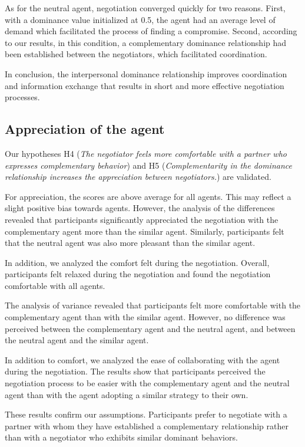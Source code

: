 \documentclass[10pt, a4paper, twocolumn]{article} %
\begin{document}
As for the neutral agent, negotiation converged quickly for two reasons. First, with a dominance value initialized at 0.5, the agent had an average level of demand which facilitated the process of finding a compromise. 
Second, according to our results, in this condition, a complementary dominance relationship had been established between the negotiators, which facilitated coordination. 

In conclusion, the interpersonal dominance relationship improves coordination and information exchange that results in short and more effective negotiation processes.

\subsection{Appreciation of the agent}
Our hypotheses H4 (\textit{The negotiator feels more comfortable with a partner who expresses complementary behavior}) and H5 (\textit{Complementarity in the dominance relationship increases the appreciation between negotiators.}) are validated. 

For appreciation, the scores are above average for all agents. This may reflect a slight positive bias towards agents. However, the analysis of the differences revealed that participants significantly appreciated the negotiation with the complementary agent more than the similar agent. Similarly, participants felt that the neutral agent was also more pleasant than the similar agent. 

In addition, we analyzed the comfort felt during the negotiation. Overall, participants felt relaxed during the negotiation and found the negotiation comfortable with all agents.  

The analysis of variance revealed that participants felt more comfortable with the complementary agent than with the similar agent. However, no difference was perceived between the complementary agent and the neutral agent, and between the neutral agent and the similar agent.

In addition to comfort, we analyzed the ease of collaborating with the agent during the negotiation. The results show that participants perceived the negotiation process to be easier with the complementary agent and the neutral agent than with the agent adopting a similar strategy to their own. 

These results confirm our assumptions. Participants prefer to negotiate with a partner with whom they have established a complementary relationship rather than with a negotiator who exhibits similar dominant behaviors. 
\end{document}
